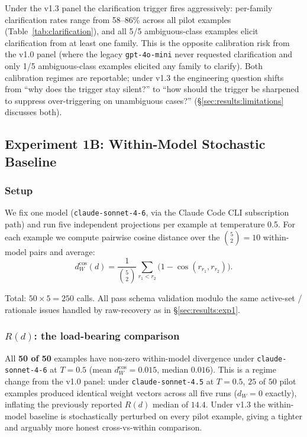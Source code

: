 Under the v1.3 panel the clarification trigger fires aggressively: per-family clarification rates range from 58--86\% across all pilot examples (Table~\ref{tab:clarification}), and all 5/5 ambiguous-class examples elicit clarification from at least one family. This is the opposite calibration risk from the v1.0 panel (where the legacy \texttt{gpt-4o-mini} never requested clarification and only 1/5 ambiguous-class examples elicited any family to clarify). Both calibration regimes are reportable; under v1.3 the engineering question shifts from ``why does the trigger stay silent?'' to ``how should the trigger be sharpened to suppress over-triggering on unambiguous cases?'' (\S\ref{sec:results:limitations} discusses both).


\subsection{Experiment 1B: Within-Model Stochastic Baseline}
\label{sec:results:exp1b}

\subsubsection{Setup}
We fix one model (\texttt{claude-sonnet-4-6}, via the Claude Code CLI subscription path) and run five independent projections per example at temperature 0.5. For each example we compute pairwise cosine distance over the $\binom{5}{2} = 10$ within-model pairs and average:
\begin{equation}
d_W^{\cos}(d) = \frac{1}{\binom{5}{2}} \sum_{r_1 < r_2} \bigl( 1 - \cos(r_{r_1}, r_{r_2}) \bigr).
\label{eq:dw_cos}
\end{equation}

Total: $50 \times 5 = 250$ calls. All pass schema validation modulo the same active-set / rationale issues handled by raw-recovery as in \S\ref{sec:results:exp1}.

\subsubsection{$R(d)$: the load-bearing comparison}
\label{sec:results:exp1b:rd}

All \textbf{50 of 50} examples have non-zero within-model divergence under \texttt{claude-sonnet-4-6} at $T = 0.5$ (mean $d_W^{\cos} = 0.015$, median $0.016$). This is a regime change from the v1.0 panel: under \texttt{claude-sonnet-4.5} at $T = 0.5$, $25$ of $50$ pilot examples produced identical weight vectors across all five runs ($d_W = 0$ exactly), inflating the previously reported $R(d)$ median of $14.4$. Under v1.3 the within-model baseline is stochastically perturbed on every pilot example, giving a tighter and arguably more honest cross-vs-within comparison.

